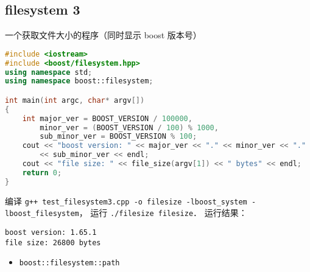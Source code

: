 \subsection{filesystem 3}
一个获取文件大小的程序（同时显示 boost 版本号）
\begin{lstlisting}[language=cpp, caption=test_filesystem3.cpp]
#include <iostream>
#include <boost/filesystem.hpp>
using namespace std;
using namespace boost::filesystem;

int main(int argc, char* argv[])
{
	int major_ver = BOOST_VERSION / 100000,
        minor_ver = (BOOST_VERSION / 100) % 1000,
		sub_minor_ver = BOOST_VERSION % 100;
	cout << "boost version: " << major_ver << "." << minor_ver << "."
        << sub_minor_ver << endl;
	cout << "file size: " << file_size(argv[1]) << " bytes" << endl;
	return 0;
}
\end{lstlisting}

编译 \verb|g++ test_filesystem3.cpp -o filesize -lboost_system -lboost_filesystem|， 运行 \verb|./filesize filesize|． 运行结果：
\begin{lstlisting}[language=plain]
boost version: 1.65.1
file size: 26800 bytes
\end{lstlisting}

\begin{itemize}
\item \verb|boost::filesystem::path|
\end{itemize}
